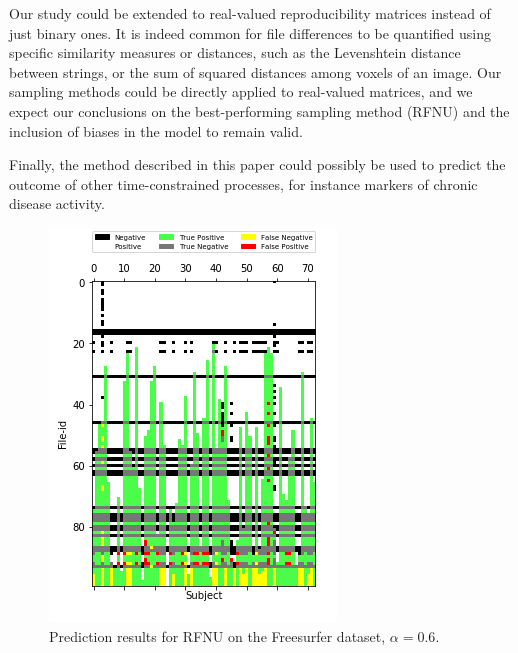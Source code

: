 \documentclass[10pt, conference, compsocconf]{IEEEtran}
\begin{document}
Our study could be extended to real-valued reproducibility 
matrices instead of just binary ones. It is indeed common for file 
differences to be quantified using specific similarity measures or 
distances, such as the Levenshtein distance between strings, or the sum of 
squared distances among voxels of an image. Our sampling methods 
could be directly applied to real-valued matrices, and we expect our 
conclusions on the best-performing sampling method (RFNU) and 
the inclusion of biases in the model to remain valid.


Finally, the method described in this paper could possibly be used to predict 
the outcome of other time-constrained processes, for instance 
markers of chronic disease activity.

\begin{figure}[h]
\centering
\includegraphics[width=0.6\columnwidth]{figures/RFNU_FS100F_ALS_06_test_data_matrix_run1.png}
\caption{Prediction results for RFNU on the Freesurfer dataset, $\alpha=0.6$.}
\label{fig:error-locality}
\end{figure}
\end{document}
